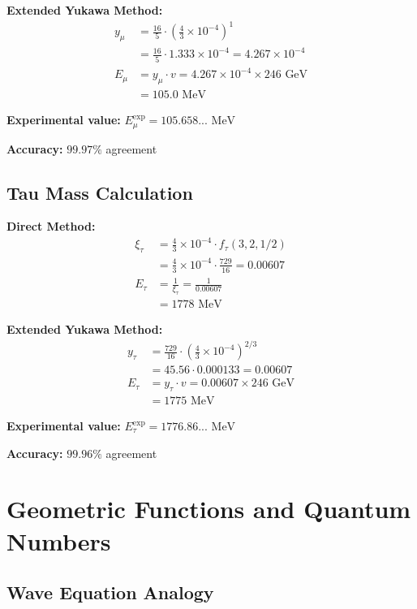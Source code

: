 \documentclass[12pt,a4paper]{report}
\begin{document}
\textbf{Extended Yukawa Method:}
\begin{align}
	y_\mu &= \frac{16}{5} \cdot \left(\frac{4}{3} \times 10^{-4}\right)^1 \\
	&= \frac{16}{5} \cdot 1.333 \times 10^{-4} = 4.267 \times 10^{-4} \\
	E_\mu &= y_\mu \cdot v = 4.267 \times 10^{-4} \times 246 \text{ GeV} \\
	&= 105.0 \text{ MeV}
\end{align}

\textbf{Experimental value:} $E_\mu^{\text{exp}} = 105.658... \text{ MeV}$

\textbf{Accuracy:} $99.97\%$ agreement

\subsection{Tau Mass Calculation}
\label{subsec:tau_calculation}

\textbf{Direct Method:}
\begin{align}
	\xi_\tau &= \frac{4}{3} \times 10^{-4} \cdot f_\tau(3,2,1/2) \\
	&= \frac{4}{3} \times 10^{-4} \cdot \frac{729}{16} = 0.00607 \\
	E_{\tau} &= \frac{1}{\xi_\tau} = \frac{1}{0.00607} \\
	&= 1778 \text{ MeV}
\end{align}

\textbf{Extended Yukawa Method:}
\begin{align}
	y_\tau &= \frac{729}{16} \cdot \left(\frac{4}{3} \times 10^{-4}\right)^{2/3} \\
	&= 45.56 \cdot 0.000133 = 0.00607 \\
	E_\tau &= y_\tau \cdot v = 0.00607 \times 246 \text{ GeV} \\
	&= 1775 \text{ MeV}
\end{align}

\textbf{Experimental value:} $E_\tau^{\text{exp}} = 1776.86... \text{ MeV}$

\textbf{Accuracy:} $99.96\%$ agreement

\section{Geometric Functions and Quantum Numbers}
\label{sec:geometric_functions}

\subsection{Wave Equation Analogy}
\label{subsec:wave_equation_analogy}
\end{document}

